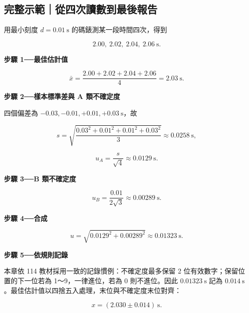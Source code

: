\documentclass[11pt,a4paper]{article}
\begin{document}
\begin{HandoutWorkedExample}

\subsection{完整示範｜從四次讀數到最後報告}\label{ux5b8cux6574ux793aux7bc4ux5f9eux56dbux6b21ux8b80ux6578ux5230ux6700ux5f8cux5831ux544a}

用最小刻度 \(d=0.01\ \mathrm{s}\) 的碼錶測某一段時間四次，得到

\[
2.00,\ 2.02,\ 2.04,\ 2.06\ \mathrm{s}.
\]

\textbf{步驟 1──最佳估計值}

\[
\bar x=\frac{2.00+2.02+2.04+2.06}{4}=2.03\ \mathrm{s}.
\]

\textbf{步驟 2──樣本標準差與 A 類不確定度}

四個偏差為 \(-0.03,-0.01,+0.01,+0.03\ \mathrm{s}\)，故

\[
s=\sqrt{\frac{0.03^2+0.01^2+0.01^2+0.03^2}{3}}
\approx0.0258\ \mathrm{s},
\]

\[
u_A=\frac{s}{\sqrt4}\approx0.0129\ \mathrm{s}.
\]

\textbf{步驟 3──B 類不確定度}

\[
u_B=\frac{0.01}{2\sqrt3}\approx0.00289\ \mathrm{s}.
\]

\textbf{步驟 4──合成}

\[
u=\sqrt{0.0129^2+0.00289^2}\approx0.01323\ \mathrm{s}.
\]

\textbf{步驟 5──依規則記錄}

本章依 114 教材採用一致的記錄慣例：不確定度最多保留 2 位有效數字；保留位置的下一位若為 1～9，一律進位，若為 0 則不進位。因此 \(0.01323\ \mathrm{s}\) 記為 \(0.014\ \mathrm{s}\)。最佳估計值以四捨五入處理，末位與不確定度末位對齊：

\[
\boxed{x=(2.030\pm0.014)\ \mathrm{s}}.
\]

\end{HandoutWorkedExample}
\end{document}
